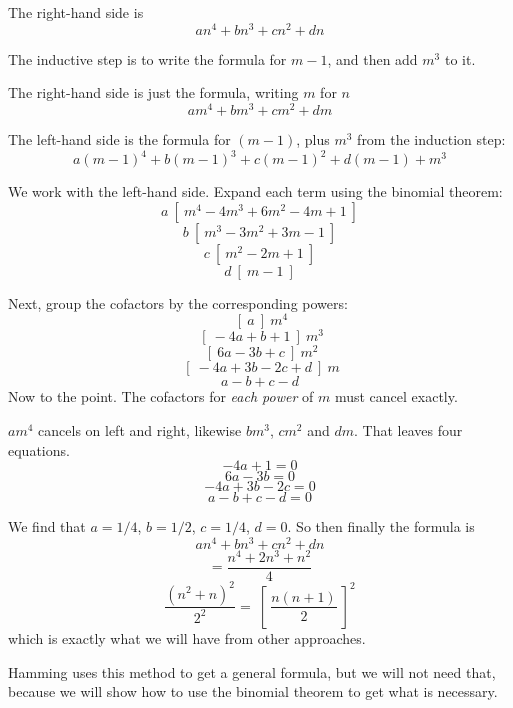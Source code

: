 \documentclass[11pt, oneside]{article}
\begin{document}
The right-hand side is 
\[ an^4 + bn^3 + cn^2 + dn \]

The inductive step is to write the formula for $m-1$, and then add $m^3$ to it.

The right-hand side is just the formula, writing $m$ for $n$
\[ am^4 + bm^3 + cm^2 + dm \]

The left-hand side is the formula for $(m-1)$, plus $m^3$ from the induction step:
\[ a(m-1)^4 + b(m-1)^3 + c(m-1)^2 + d(m-1) + m^3 \]

We work with the left-hand side.  Expand each term using the binomial theorem:
\[ a \ [ \ m^4 - 4m^3 + 6m^2 - 4m + 1 \ ]  \]
\[ b \ [ \ m^3 - 3m^2 + 3m -1 \ ]  \]
\[ c \ [ \ m^2 - 2m + 1 \ ]  \]
\[ d \ [ \ m - 1 \ ]  \] 

Next, group the cofactors by the corresponding powers:
\[  \ [ \ a \ ] \ m^4 \]
\[  \ [ \ -4a + b + 1 \ ] \ m^3 \]
\[  \ [ \ 6a - 3b + c \ ] \ m^2 \]
\[  \ [ \ -4a + 3b - 2c + d \ ] \ m \]
\[ a - b + c - d \]
Now to the point.  The cofactors for \emph{each power} of $m$ must cancel exactly.

$am^4$ cancels on left and right, likewise $bm^3$, $cm^2$ and $dm$.  That leaves four equations.
\[ -4a + 1 = 0 \]
\[ 6a - 3b = 0 \]
\[ -4a + 3b - 2c = 0 \]
\[ a - b + c - d = 0 \]

We find that $a = 1/4$, $b = 1/2$, $c = 1/4$, $d = 0$.  So then finally the formula is
\[ an^4 + bn^3 + cn^2 + dn \]
\[ = \frac{n^4 + 2n^3 + n^2}{4} \]
\[ \frac{(n^2 + n)^2}{2^2} = \ [ \ \frac{n(n+1)}{2} \ ]^2 \]
which is exactly what we will have from other approaches.

Hamming uses this method to get a general formula, but we will not need that, because we will show how to use the binomial theorem to get what is necessary.
\end{document}
